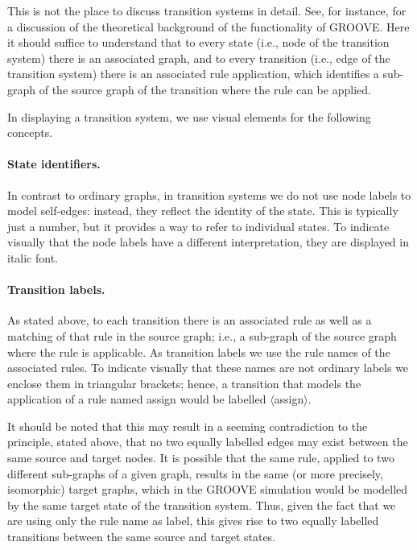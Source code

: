 This is not the place to discuss transition systems in detail. See, for
instance, \cite{Rens03a} for a discussion of the theoretical background of the
functionality of GROOVE. Here it should suffice to understand that to every
state (i.e., node of the transition system) there is an associated graph, and
to every transition (i.e., edge of the transition system) there is an
associated rule application, which identifies a sub-graph of the source graph
of the transition where the rule can be applied.

In displaying a transition system, we use visual elements for the
following concepts.

\paragraph{State identifiers.}

In contrast to ordinary graphs, in transition systems we do not use node labels
to model self-edges: instead, they reflect the identity of the state. This is
typically just a number, but it provides a way to refer to individual
states. To indicate visually that the node labels have a different
interpretation, they are displayed in italic font.

\paragraph{Transition labels.}

As stated above, to each transition there is an associated rule as well as a
matching of that rule in the source graph; i.e., a sub-graph of the source
graph where the rule is applicable. As transition labels we use the rule names
of the associated rules. To indicate visually that these names are not ordinary
labels we enclose them in triangular brackets; hence, a transition that models
the application of a rule named \textsf{assign} would be labelled
\textsf{$\langle$assign$\rangle$}.

It should be noted that this may result in a seeming contradiction to the
principle, stated above, that no two equally labelled edges may exist between
the same source and target nodes. It is possible that the same rule, applied to
two different sub-graphs of a given graph, results in the same (or more
precisely, isomorphic) target graphs, which in the GROOVE simulation would be
modelled by the same target state of the transition system. Thus, given the
fact that we are using only the rule name as label, this gives rise to two
equally labelled transitions between the same source and target states.

